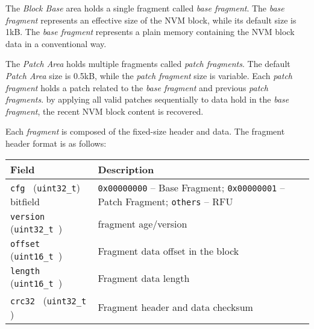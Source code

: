 The \textit{Block Base} area holds a single fragment called \textit{base fragment}. 
The \textit{base fragment} represents an effective size of the NVM block, while its default size is 1kB.
The \textit{base fragment} represents a plain memory containing the NVM block data in a conventional way.

The \textit{Patch Area} holds multiple fragments called \textit{patch fragments}.
The default \textit{Patch Area} size is 0.5kB, while the \textit{patch fragment} size is variable.
Each \textit{patch fragment} holds a patch related to the \textit{base fragment} and previous \textit{patch fragments}.
by applying all valid patches sequentially to data hold in the \textit{base fragment}, 
the recent NVM block content is recovered.

Each \textit{fragment} is composed of the fixed-size header and data. The fragment header format is as follows:

\begin{table*}[!ht]
  \hspace*{0cm}
  \begin{tabular}{| p{5cm} | p{5.5cm} | }
      \hline
      \rowcolor{SeaGreen3!30!} {\bf Field} & {\bf Description} \\
      \hline
      \hline
      {\tt cfg     } ({\tt uint32\_t}) \newline bitfield  & {\tt 0x00000000} -- Base Fragment;\newline
                          {\tt 0x00000001} -- Patch Fragment;\newline
                          {\tt others} -- RFU\\
      \hline
      {\tt version } ({\tt uint32\_t }) & fragment age/version \newline {\tt [1, INT\_MAX]}\\
      \hline
      {\tt offset  } ({\tt uint16\_t })  & Fragment data offset in the block \\
      \hline
      {\tt length  } ({\tt uint16\_t })  & Fragment data length \\
      \hline
      {\tt crc32   } ({\tt uint32\_t })  & Fragment header and data checksum \\
      \hline
  \end{tabular}
  \label{tab:nvmFragmentHeader}
 \end{table*}

\clearpage
 
